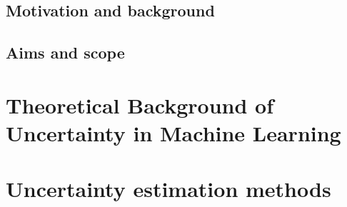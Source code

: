 \documentclass[11pt,a4paper]{report}
\begin{document}
\section{Motivation and background}

\section{Aims and scope}



\chapter{Theoretical Background of Uncertainty in Machine Learning}







\chapter{Uncertainty estimation methods}








\end{document}
